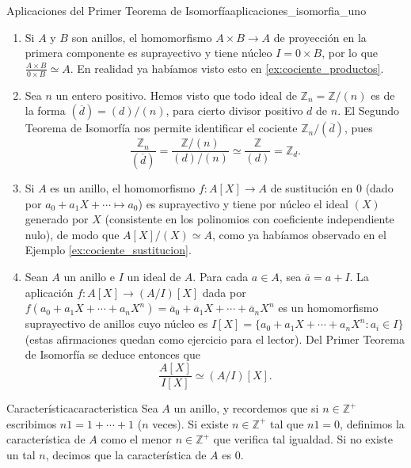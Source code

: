 \begin{example}{Aplicaciones del Primer Teorema de Isomorfía}{aplicaciones_isomorfia_uno}
\begin{enumerate}
    \item Si $A$ y $B$ son anillos, el homomorfismo $A \times B \to A$ de proyección en la primera componente es suprayectivo y tiene núcleo $I = 0 \times B$, por lo que $\frac{A \times B}{0 \times B} \simeq A$. En realidad ya habíamos visto esto en \ref{ex:cociente_productos}.
    
    \item Sea $n$ un entero positivo. Hemos visto que todo ideal de $\mathbb{Z}_n = \mathbb{Z}/ (n)$ es de la forma $(\overline{d}) = (d) / (n)$, para cierto divisor positivo $d$ de $n$. El Segundo Teorema de Isomorfía nos permite identificar el cociente $\mathbb{Z}_n/ (\overline{d})$, pues
    \[
    \frac{\mathbb{Z}_n}{(\overline{d})} = \frac{\mathbb{Z}/ (n)}{(d) / (n)} \simeq \frac{\mathbb{Z}}{ (d) } = \mathbb{Z}_d.
    \]
    
    \item Si $A$ es un anillo, el homomorfismo $f : A[X] \to A$ de sustitución en $0$ (dado por $a_0 + a_1 X + \cdots \mapsto a_0$) es suprayectivo y tiene por núcleo el ideal $(X)$ generado por $X$ (consistente en los polinomios con coeficiente independiente nulo), de modo que $A[X]/(X) \simeq A$, como ya habíamos observado en el Ejemplo \ref{ex:cociente_sustitucion}.
    
    \item Sean $A$ un anillo e $I$ un ideal de $A$. Para cada $a \in A$, sea $\overline{a} = a + I$. La aplicación $f : A[X] \to (A/I)[X]$ dada por $f(a_0 + a_1 X + \cdots + a_n X^n) = \overline{a}_0 + \overline{a}_1 X + \cdots + \overline{a}_n X^n$ es un homomorfismo suprayectivo de anillos cuyo núcleo es $I[X] = \{a_0 + a_1 X + \cdots + a_n X^n : a_i \in I\}$ (estas afirmaciones quedan como ejercicio para el lector). Del Primer Teorema de Isomorfía se deduce entonces que
    \[
    \frac{A[X]}{I[X]} \simeq (A/I)[X].
    \]
\end{enumerate}
\end{example}

\begin{definition}{Característica}{caracteristica}
Sea $A$ un anillo, y recordemos que si $n \in \mathbb{Z}^+$ escribimos $n1 = 1 + \cdots + 1$ ($n$ veces). Si existe $n \in \mathbb{Z}^+$ tal que $n1 = 0$, definimos la característica de $A$ como el menor $n \in \mathbb{Z}^+$ que verifica tal igualdad. Si no existe un tal $n$, decimos que la característica de $A$ es $0$.
\end{definition}

